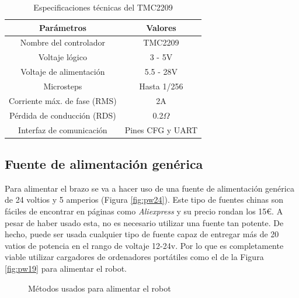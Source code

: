\begin{table}[H]
\begin{center}
\begin{tabular}{|c|c|}
\hline
\textbf{Parámetros} & \textbf{Valores} \\
\hline
Nombre del controlador & TMC2209 \\
Voltaje lógico & 3 - 5V \\
Voltaje de alimentación & 5.5 - 28V \\
Microsteps & Hasta 1/256 \\
Corriente máx. de fase (RMS) & 2A \\
Pérdida de conducción (RDS) & 0.2$\Omega$ \\
Interfaz de comunicación & Pines CFG y UART \\
\hline
\end{tabular}
\caption{Especificaciones técnicas del TMC2209}
\label{cuadro:ejemplo}
\end{center}
\end{table}
    
\subsection{Fuente de alimentación genérica}
\label{subsec:fuente_alimentacion}
\noindent Para alimentar el brazo se va a hacer uso de una fuente de alimentación genérica de 24 voltios y 5 amperios (Figura \ref{fig:pw24}). Este tipo de fuentes chinas son 
fáciles de encontrar en páginas como \textit{Aliexpress} y su precio rondan los 15\euro. A pesar de haber usado esta, no es 
necesario utilizar una fuente tan potente. De hecho, puede ser usada cualquier tipo de fuente capaz de 
entregar más de 20 vatios de potencia en el rango de voltaje 12-24v. Por lo que es completamente viable utilizar cargadores de ordenadores 
portátiles como el de la Figura \ref{fig:pw19} para alimentar el robot.

\begin{figure} [ht!]
  \centering   
  \hspace{1cm}
  \caption{Métodos usados para alimentar el robot}
\end{figure}


